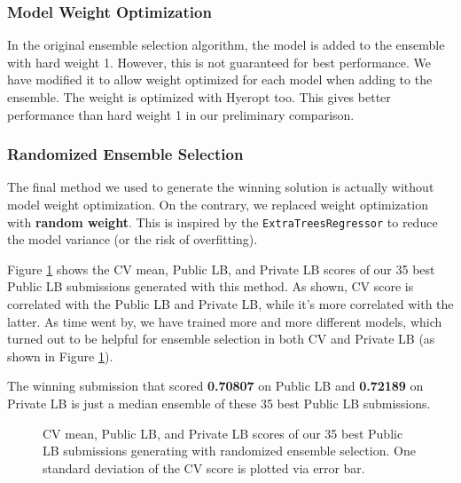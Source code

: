 \documentclass[12pt]{article}
\begin{document}
\subsubsection{Model Weight Optimization}
In the original ensemble selection algorithm, the model is added to the ensemble with hard weight 1. However, this is not guaranteed for best performance. We have modified it to allow weight optimized for each model when adding to the ensemble. The weight is optimized with Hyeropt too. This gives better performance than hard weight 1 in our preliminary comparison.

\subsubsection{Randomized Ensemble Selection}
The final method we used to generate the winning solution is actually without model weight optimization. On the contrary, we replaced weight optimization with \textbf{random weight}. This is inspired by the \texttt{ExtraTreesRegressor} to reduce the model variance (or the risk of overfitting). 

Figure \ref{fig:CV_Public_Private} shows the CV mean, Public LB, and Private LB scores of our 35 best Public LB submissions generated with this method. As shown, CV score is correlated with the Public LB and Private LB, while it's more correlated with the latter. As time went by, we have trained more and more different models, which turned out to be helpful for ensemble selection in both CV and Private LB (as shown in Figure \ref{fig:CV_Public_Private}).

The winning submission that scored \textbf{0.70807} on Public LB and \textbf{0.72189} on Private LB is just a median ensemble of these 35 best Public LB submissions.

\begin{figure}[t]
\centering
{}
\caption{CV mean, Public LB, and Private LB scores of our 35 best Public LB submissions generating with randomized ensemble selection. One standard deviation of the CV score is plotted via error bar.}
\label{fig:CV_Public_Private}
\end{figure}
\end{document}
